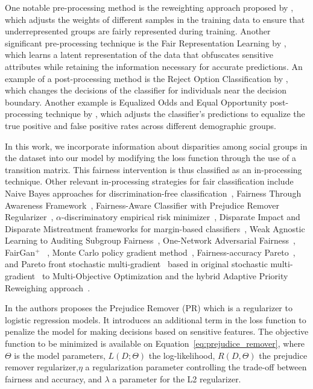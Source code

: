 One notable pre-processing method is the reweighting approach proposed by \citet{Kamiran2012}, which adjusts the weights of different samples in the training data to ensure that underrepresented groups are fairly represented during training. Another significant pre-processing technique is the Fair Representation Learning by \citet{Zemel2013}, which learns a latent representation of the data that obfuscates sensitive attributes while retaining the information necessary for accurate predictions. An example of a post-processing method is the Reject Option Classification by \citet{Kamiran2012b}, which changes the decisions of the classifier for individuals near the decision boundary. Another example is Equalized Odds and Equal Opportunity post-processing technique by \citet{Hardt2016}, which adjusts the classifier's predictions to equalize the true positive and false positive rates across different demographic groups.

In this work, we incorporate information about disparities among social groups in the dataset into our model by modifying the loss function through the use of a transition matrix. This fairness intervention is thus classified as an in-processing technique. Other relevant in-processing strategies for fair classification include Naive Bayes approaches for discrimination-free classification~\citep{Calders2010}, Fairness Through Awareness Framework~\citep{Dwork2011}, Fairness-Aware Classifier with Prejudice Remover Regularizer~\cite{Kamishima2012}, $\alpha$-discriminatory empirical risk minimizer~\citep{Woodworth2017}, Disparate Impact and Disparate Mistreatment frameworks for margin-based classifiers~\citep{Zafar2017a,Zafar2017b}, Weak Agnostic Learning to Auditing Subgroup Fairness~\citep{kearns18a,Kearns2018}, One-Network Adversarial Fairness~\citep{Adel2019}, FairGan$^{+}$ ~\citep{Xu2019}, Monte Carlo policy gradient method~\citep{Petrovic2021}, Fairness-accuracy Pareto~\citep{Wei2022}, and Pareto front stochastic multi-gradient~\citep{Liu2022} based in original stochastic multi-gradient~\citep{Mercier2018} to Multi-Objective Optimization and the hybrid Adaptive Priority Reweighing approach~\cite{HuXT23}.

In \cite{Kamishima2012} the authors proposes the Prejudice Remover (PR) which is a regularizer to logistic regression models. It introduces an additional term in the loss function to penalize the model for making decisions based on sensitive features. The objective function to be minimized is available on Equation~\ref{eq:prejudice_remover}, where $\Theta$ is the model parameters, $L(D;\Theta)$ the log-likelihood, $R(D, \Theta)$ the prejudice remover regularizer,$\eta$ a regularization parameter controlling the trade-off between fairness and accuracy, and $\lambda$ a parameter for the L2 regularizer.

